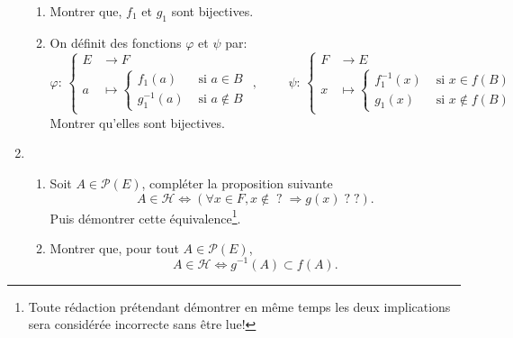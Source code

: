 \begin{enumerate}
\begin{enumerate}
  \item Montrer que, $f_1$ et $g_1$ sont bijectives.
  \item On définit des fonctions $\varphi$ et $\psi$ par:
\begin{displaymath}
\varphi :\,
\left\lbrace 
  \begin{aligned}
    E &\rightarrow F \\
    a &\mapsto
      \left\lbrace 
        \begin{aligned}
          f_1(a) &\text{ si } a\in B \\ g_1^{-1}(a) &\text{ si } a\notin B 
        \end{aligned}
      \right. 
  \end{aligned}
\right.
,\hspace{1cm}
\psi :\,
\left\lbrace 
  \begin{aligned}
    F &\rightarrow E \\
    x &\mapsto
      \left\lbrace 
        \begin{aligned}
          f_1^{-1}(x) &\text{ si } x\in f(B) \\ g_1(x) &\text{ si } x\notin f(B) 
        \end{aligned}
      \right. 
  \end{aligned}
\right.
\end{displaymath}
Montrer qu'elles sont bijectives.
\end{enumerate}

\item 
\begin{enumerate}
  \item  Soit $A\in \mathcal{P}(E)$, compléter la proposition suivante
\begin{displaymath}
A \in \mathcal{H} \Leftrightarrow \left( \forall x \in F, x \notin \;?\; \Rightarrow g(x) \; ?\; ?\right)  . 
\end{displaymath}
Puis démontrer cette équivalence\footnote{Toute rédaction prétendant démontrer en même temps les deux implications sera considérée incorrecte sans être lue!}.
  \item Montrer que, pour tout $A\in \mathcal{P}(E)$,
\begin{displaymath}
  A \in \mathcal{H} \Leftrightarrow g^{-1}(A) \subset f(A) .
\end{displaymath}
\end{enumerate}


\end{enumerate}
